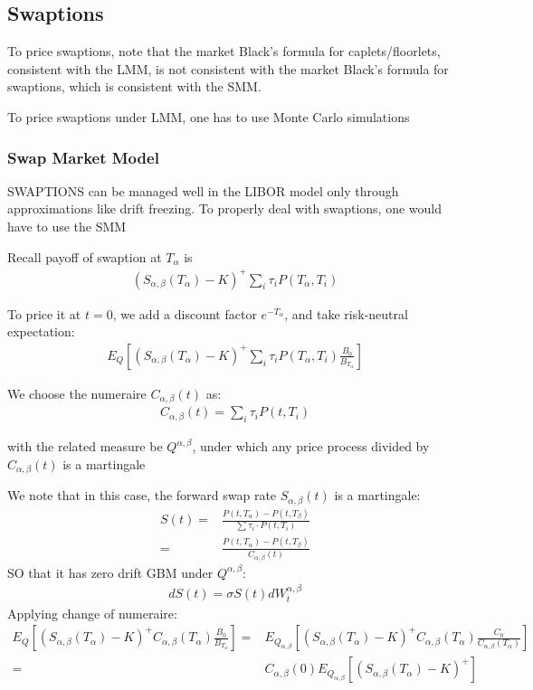\subsection{Swaptions}
To price swaptions, note that the market Black's formula for
caplets/floorlets, consistent with the LMM, is not consistent with the
market Black's formula for swaptions, which is consistent with the
SMM.

To price swaptions under LMM, one has to use Monte Carlo simulations

\subsubsection{Swap Market Model}
SWAPTIONS can be managed well in the LIBOR model only through
approximations like drift freezing. To properly deal with swaptions, one
would have to use the SMM

Recall payoff of swaption at $T_\alpha$ is
\begin{align*}
    (S_{\alpha, \beta} (T_\alpha) - K )^+ \sum_i \tau_i P(T_\alpha, T_i)
\end{align*}

To price it at $ t= 0 $, we add a discount factor $e^{-T_\alpha}$, 
and take risk-neutral expectation:
\begin{align*}
    E_Q \left[ (S_{\alpha, \beta} (T_\alpha) - K )^+ \sum_i \tau_i P(T_\alpha, T_i) 
    \frac{B_0}{B_{T_\alpha}} \right]
\end{align*}

We choose the numeraire $ C_{\alpha, \beta} (t) $ as:
\begin{align*}
    C_{\alpha, \beta} (t) = \sum_i \tau_i P(t, T_i)
\end{align*}

with the related measure be $ Q^{\alpha, \beta}$, under which
any price process divided by $ C_{\alpha, \beta} (t) $ is a martingale

We note that in this case, the forward swap rate
$  S_{\alpha, \beta} (t) $ is a martingale:
\begin{align*}
    S(t) =& \frac{P(t, T_{\alpha}) - P(t, T_{\beta})}{\sum \tau_i \cdot P(t, T_i)}\\
    =& \frac{P(t, T_{\alpha}) - P(t, T_{\beta})}{C_{\alpha, \beta} (t)}
\end{align*}
SO that it has zero drift GBM under $ Q^{\alpha, \beta}$:
\begin{align*}
    dS(t) = \sigma S(t) dW_t^{\alpha, \beta}
\end{align*}
Applying change of numeraire:
\begin{align*}
    E_Q \left[ (S_{\alpha, \beta} (T_\alpha) - K )^+ C_{\alpha, \beta} (T_\alpha) 
    \frac{B_0}{B_{T_\alpha}} \right] 
    =& E_{Q_{\alpha, \beta}} \left[ (S_{\alpha, \beta} (T_\alpha) - K )^+ C_{\alpha, \beta} (T_\alpha) 
    \frac{C_0}{C_{\alpha, \beta} (T_\alpha)} \right]\\
    =& C_{\alpha, \beta} (0) E_{Q_{\alpha, \beta}} \left[ (S_{\alpha, \beta} (T_\alpha) - K )^+ \right]
\end{align*}

